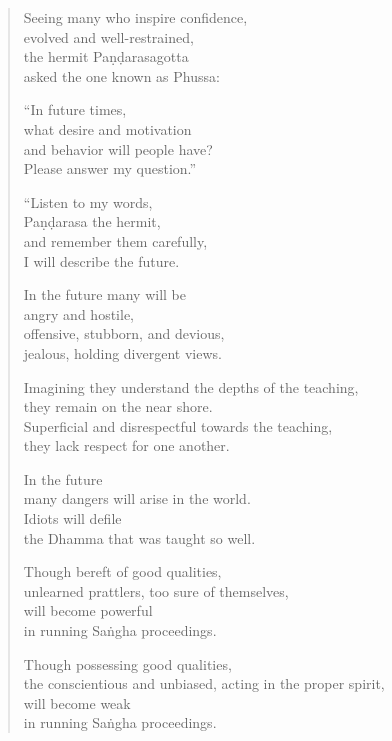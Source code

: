 \documentclass[12pt,openany]{book}%
\begin{document}
\begin{verse}%
Seeing many who inspire confidence, \\
evolved and well-restrained, \\
the hermit \textsanskrit{Paṇḍarasagotta} \\
asked the one known as Phussa: 

“In future times, \\
what desire and motivation \\
and behavior will people have? \\
Please answer my question.” 

“Listen to my words, \\
\textsanskrit{Paṇḍarasa} the hermit, \\
and remember them carefully, \\
I will describe the future. 

In the future many will be \\
angry and hostile, \\
offensive, stubborn, and devious, \\
jealous, holding divergent views. 

Imagining they understand the depths of the teaching, \\
they remain on the near shore. \\
Superficial and disrespectful towards the teaching, \\
they lack respect for one another. 

In the future \\
many dangers will arise in the world. \\
Idiots will defile \\
the Dhamma that was taught so well. 

Though bereft of good qualities, \\
unlearned prattlers, too sure of themselves, \\
will become powerful \\
in running \textsanskrit{Saṅgha} proceedings. 

Though possessing good qualities, \\
the conscientious and unbiased, acting in the proper spirit, \\
will become weak \\
in running \textsanskrit{Saṅgha} proceedings. 


\end{verse}
\end{document}
